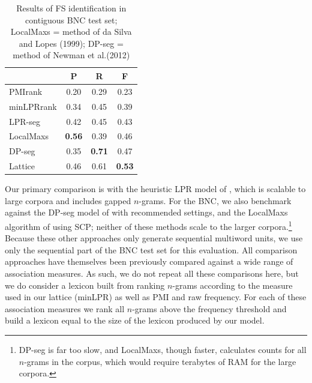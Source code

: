 \documentclass[11pt,letterpaper]{article}
\makeatletter
\def \al {al.\@ }
\makeatother
\begin{document}
 \begin{table}[!bt]
 
 \begin{center}
	
	 \begin{tabular}{lccc}

       \toprule
			& P & R & F\\
			 \midrule
			PMIrank & 0.20 & 0.29 & 0.23 \\
			minLPRrank & 0.34 & 0.45 & 0.39 \\
			LPR-seg & 0.42 & 0.45 & 0.43 \\
			LocalMaxs & \bf{0.56} & 0.39 & 0.46 \\
			DP-seg & 0.35 & \bf{0.71} & 0.47 \\
  \midrule
			Lattice & 0.46 & 0.61 & \bf{0.53} \\
       \bottomrule
 \end{tabular}
  \caption{ Results of FS identification in contiguous BNC test set; LocalMaxs = method of da Silva and Lopes (1999); DP-seg = method of Newman et \al (2012)}
	\label{tab:BNC}

 \end{center}

 \end{table}	



 Our primary comparison is with the heuristic LPR model of , which is scalable to large corpora and includes gapped $n$-grams. For the BNC, we also benchmark against the DP-seg model of  with recommended settings, and the LocalMaxs algorithm of  using SCP; neither of these methods scale to the larger corpora.\footnote{DP-seg is far too slow, and LocalMaxs, though faster, calculates counts for all $n$-grams in the corpus, which would require terabytes of RAM for the large corpora.} Because these other approaches only generate sequential multiword units, we use only the sequential part of the BNC test set for this evaluation. All comparison approaches have themselves been previously compared against a wide range of association measures. As such, we do not repeat all these comparisons here, but we do consider a lexicon built from ranking $n$-grams according to the measure used in our lattice (minLPR) as well as PMI and raw frequency. For each of these association measures we rank all $n$-grams above the frequency threshold and build a lexicon equal to the size of the lexicon produced by our model.
\end{document}
